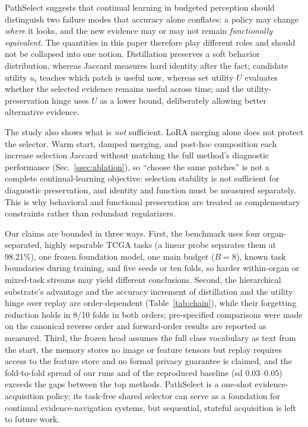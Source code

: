 \documentclass{article}
\begin{document}
PathSelect suggests that continual learning in budgeted perception should distinguish two failure modes that accuracy alone conflates: a policy may change \emph{where} it looks, and the new evidence may or may not remain \emph{functionally equivalent}. The quantities in this paper therefore play different roles and should not be collapsed into one notion. Distillation preserves a soft behavior distribution, whereas Jaccard measures hard identity after the fact; candidate utility $u_i$ teaches which patch is useful now, whereas set utility $U$ evaluates whether the selected evidence remains useful across time; and the utility-preservation hinge uses $U$ as a lower bound, deliberately allowing better alternative evidence.

The study also shows what is \emph{not} sufficient. LoRA merging alone does not protect the selector. Warm start, damped merging, and post-hoc composition each increase selection Jaccard without matching the full method's diagnostic performance (Sec.~\ref{ssec:ablation}), so ``choose the same patches'' is not a complete continual-learning objective: selection stability is not sufficient for diagnostic preservation, and identity and function must be measured separately. This is why behavioral and functional preservation are treated as complementary constraints rather than redundant regularizers.

Our claims are bounded in three ways. First, the benchmark uses four organ-separated, highly separable TCGA tasks (a linear probe separates them at 98.21\%), one frozen foundation model, one main budget ($B=8$), known task boundaries during training, and five seeds or ten folds, so harder within-organ or mixed-task streams may yield different conclusions. Second, the hierarchical substrate's advantage and the accuracy increment of distillation and the utility hinge over replay are order-dependent (Table~\ref{tab:chain}), while their forgetting reduction holds in 8/10 folds in both orders; pre-specified comparisons were made on the canonical reverse order and forward-order results are reported as measured. Third, the frozen head assumes the full class vocabulary as text from the start, the memory stores no image or feature tensors but replay requires access to the feature store and no formal privacy guarantee is claimed, and the fold-to-fold spread of our runs and of the reproduced baseline (sd $0.03$--$0.05$) exceeds the gaps between the top methods. PathSelect is a one-shot evidence-acquisition policy; its task-free shared selector can serve as a foundation for continual evidence-navigation systems, but sequential, stateful acquisition is left to future work.
\end{document}
